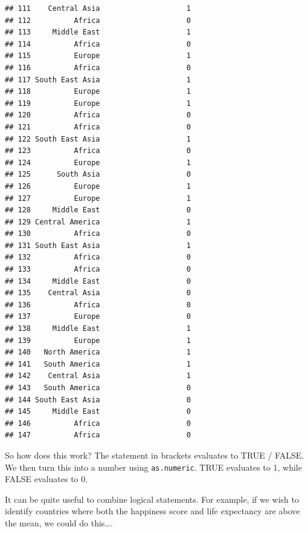 \documentclass[]{article}
\newenvironment{Shaded}{\begin{snugshade}}{\end{snugshade}}
\newcommand{\FunctionTok}[1]{\textcolor[rgb]{0.00,0.00,0.00}{#1}}
\newcommand{\NormalTok}[1]{#1}
\newcommand{\OtherTok}[1]{\textcolor[rgb]{0.56,0.35,0.01}{#1}}
\newcommand{\SpecialCharTok}[1]{\textcolor[rgb]{0.00,0.00,0.00}{#1}}
\begin{document}
\begin{verbatim}
## 111    Central Asia                    1
## 112          Africa                    0
## 113     Middle East                    1
## 114          Africa                    0
## 115          Europe                    1
## 116          Africa                    0
## 117 South East Asia                    1
## 118          Europe                    1
## 119          Europe                    1
## 120          Africa                    0
## 121          Africa                    0
## 122 South East Asia                    1
## 123          Africa                    0
## 124          Europe                    1
## 125      South Asia                    0
## 126          Europe                    1
## 127          Europe                    1
## 128     Middle East                    0
## 129 Central America                    1
## 130          Africa                    0
## 131 South East Asia                    1
## 132          Africa                    0
## 133          Africa                    0
## 134     Middle East                    0
## 135    Central Asia                    0
## 136          Africa                    0
## 137          Europe                    0
## 138     Middle East                    1
## 139          Europe                    1
## 140   North America                    1
## 141   South America                    1
## 142    Central Asia                    1
## 143   South America                    0
## 144 South East Asia                    0
## 145     Middle East                    0
## 146          Africa                    0
## 147          Africa                    0
\end{verbatim}

So how does this work? The statement in brackets evaluates to TRUE /
FALSE. We then turn this into a number using \texttt{as.numeric}. TRUE
evaluates to 1, while FALSE evaluates to 0.

It can be quite useful to combine logical statements. For example, if we
wish to identify countries where both the happiness score and life
expectancy are above the mean, we could do this\ldots.

\begin{Shaded}
\end{Shaded}
\end{document}
